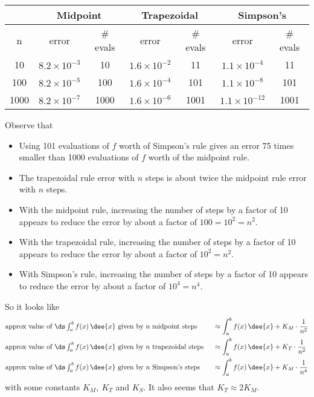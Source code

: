 \renewcommand{\arraystretch}{1.1}
\begin{center}
     \begin{tabular}{|c|c|c|c|c|c|c|}
          \hline
          & \multicolumn{2}{|c|}{\textbf{Midpoint}}&
            \multicolumn{2}{|c|}{\textbf{Trapezoidal}}&
            \multicolumn{2}{|c|}{\textbf{Simpson's}}\\          \hline
          n & error & \#  evals & error & \#  evals
                & error & \# evals \\
          \hline
          10 & $8.2\times 10^{-3}$ & 10 & $1.6\times 10^{-2}$ & 11 &
                  $1.1\times 10^{-4}$ & 11 \\
          100 & $8.2\times 10^{-5}$ & 100 & $1.6\times 10^{-4}$ & 101 &
                  $1.1\times 10^{-8}$ & 101 \\
          1000 & $8.2\times 10^{-7}$ & 1000 & $1.6\times 10^{-6}$ & 1001 &
                  $1.1\times 10^{-12}$ & 1001 \\
          \hline
     \end{tabular}
\end{center}
\renewcommand{\arraystretch}{1.0}


\noindent Observe that
\begin{itemize}
\item
   Using 101 evaluations of $f$ worth of Simpson's rule gives
   an error 75 times smaller than 1000 evaluations of $f$ worth
   of the midpoint rule.
\item
   The trapezoidal rule error with $n$ steps is about twice
   the midpoint rule  error with $n$ steps.
\item
    With the midpoint rule, increasing the number of steps
   by a factor of 10 appears to reduce the error by about a factor of
   $100=10^2=n^2$.
\item
  With the trapezoidal rule, increasing the number of steps
 by a factor of 10 appears to reduce the error by about a factor of $10^2=n^2$.
\item
   With Simpson's rule, increasing the number of steps
 by a factor of 10 appears to reduce the error by about a factor of $10^4=n^4$.
\end{itemize}

\noindent So it looks like
\begin{alignat*}{3}
&\hbox{approx value of $\ds\int_a^b f(x)\,\dee{x}$ given by $n$ midpoint steps  }
&&\approx \int_a^b f(x)\,\dee{x}+K_M\cdot \frac{1}{n^2}\\
%
&\hbox{approx value of $\ds\int_a^b f(x)\,\dee{x}$ given by $n$ trapezoidal steps  }
&&\approx  \int_a^b f(x)\,\dee{x}+K_T\cdot \frac{1}{n^2}\\
%
&\hbox{approx value of $\ds\int_a^b f(x)\,\dee{x}$ given by $n$ Simpson's steps  }
&&\approx  \int_a^b f(x)\,\dee{x}+K_M\cdot \frac{1}{n^4}
\end{alignat*}
with some constants $K_M,\ K_T$ and $K_S$. It also seems that $K_T\approx
2 K_M$.

